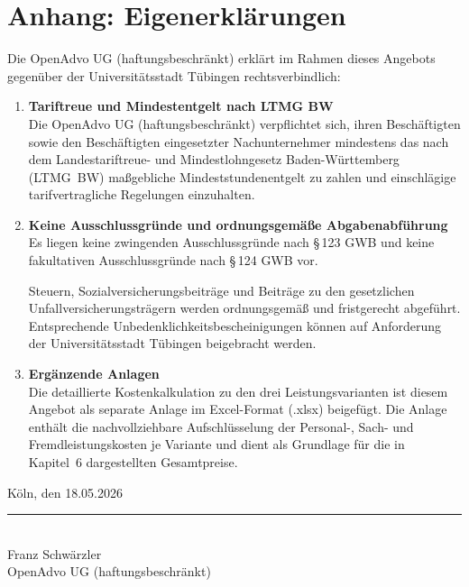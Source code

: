 \chapter*{Anhang: Eigenerklärungen}

Die OpenAdvo UG (haftungsbeschränkt) erklärt im Rahmen dieses Angebots
gegenüber der Universitätsstadt Tübingen rechtsverbindlich:

\begin{enumerate}[label=\textbf{\arabic*.}, leftmargin=2em, itemsep=1em]

  \item \textbf{Tariftreue und Mindestentgelt nach LTMG BW}\\
    Die OpenAdvo UG (haftungsbeschränkt) verpflichtet sich, ihren
    Beschäftigten sowie den Beschäftigten eingesetzter Nachunternehmer
    mindestens das nach dem Landestariftreue- und Mindestlohngesetz
    Baden-Württemberg (LTMG~BW) maßgebliche Mindeststundenentgelt zu zahlen
    und einschlägige tarifvertragliche Regelungen einzuhalten.

  \item \textbf{Keine Ausschlussgründe und ordnungsgemäße Abgabenabführung}\\
    Es liegen keine zwingenden Ausschlussgründe nach \S\,123 GWB und keine
    fakultativen Ausschlussgründe nach \S\,124 GWB vor.

    Steuern, Sozialversicherungsbeiträge und Beiträge zu den gesetzlichen
    Unfallversicherungsträgern werden ordnungsgemäß und fristgerecht
    abgeführt. Entsprechende Unbedenklichkeitsbescheinigungen können auf
    Anforderung der Universitätsstadt Tübingen beigebracht werden.

  \item \textbf{Ergänzende Anlagen}\\
    Die detaillierte Kostenkalkulation zu den drei Leistungsvarianten ist
    diesem Angebot als separate Anlage im Excel-Format (.xlsx) beigefügt.
    Die Anlage enthält die nachvollziehbare Aufschlüsselung der Personal-,
    Sach- und Fremdleistungskosten je Variante und dient als Grundlage für
    die in Kapitel~6 dargestellten Gesamtpreise.

\end{enumerate}

\vfill
\noindent
Köln, den 18.05.2026

\bigskip\bigskip
\noindent
\rule{6cm}{0.4pt}\\
Franz Schwärzler\\
OpenAdvo UG (haftungsbeschränkt)
